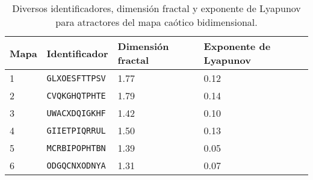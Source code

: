         \begin{table}[htbp]
            \centering
            \caption{Diversos identificadores, dimensión fractal y exponente de Lyapunov para atractores del mapa caótico bidimensional.}
            \begin{tabular}{|l|l|l|l|}
                \hline
                \rowcolor{lightgray}  Mapa & Identificador & Dimensión fractal & Exponente de Lyapunov \\
                \hline
                1     & \verb|GLXOESFTTPSV| & 1.77  & 0.12   \\ %
                \hline
                2     & \verb|CVQKGHQTPHTE| & 1.79  & 0.14   \\ %
                \hline
                3     & \verb|UWACXDQIGKHF| & 1.42  & 0.10   \\ %
                \hline
                4    &  \verb|GIIETPIQRRUL| & 1.50  & 0.13   \\ %
                \hline
                5     & \verb|MCRBIPOPHTBN| & 1.39  & 0.05   \\ %
                \hline
                6     & \verb|ODGQCNXODNYA| & 1.31  & 0.07   \\ %
                \hline
            \end{tabular}
            \label{tab:codificacion}
        \end{table}

